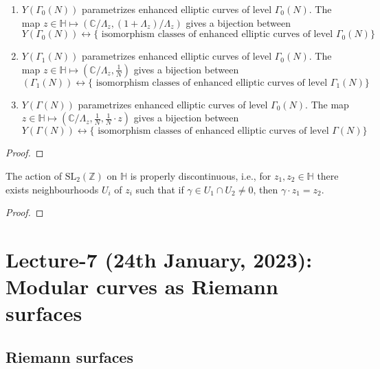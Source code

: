 \documentclass[oneside, 12pt]{scrbook}
\newcommand{\CC}{\mathbb C}
\newcommand{\ZZ}{\mathbb Z}
\newcommand{\SL}{\mathrm{SL}}
\newcommand{\HH}{\mathbb{H}}
\theoremstyle{theorem}
\begin{document}
\begin{proposition}
\begin{enumerate}
\item $Y(\Gamma_{0}(N))$ parametrizes enhanced elliptic curves of level $\Gamma_{0}(N)$. The map $z\in \HH \mapsto \left( \CC/\Lambda_{z} , \left( 1 + \Lambda_{z} \right)/\Lambda_{z}\right)$ gives a bijection between 
$$Y (\Gamma_{0}(N)) \leftrightarrow \{\text{ isomorphism classes of enhanced elliptic curves of level } \Gamma_{0}(N)\}$$
\item $Y(\Gamma_{1}(N))$ parametrizes enhanced elliptic curves of level $\Gamma_{0}(N)$. The map $z\in \HH \mapsto \left( \CC/\Lambda_{z} , \frac{1}{N} \right)$ gives a bijection between 
$$ (\Gamma_{1}(N)) \leftrightarrow \{\text{ isomorphism classes of enhanced elliptic curves of level } \Gamma_{1}(N)\}$$
\item $Y(\Gamma(N))$ parametrizes enhanced elliptic curves of level $\Gamma_{0}(N)$. The map $z\in \HH \mapsto \left( \CC/\Lambda_{z} , \frac{1}{N} , \frac{1}{N} \cdot z \right)$ gives a bijection between 
$$Y (\Gamma(N)) \leftrightarrow \{\text{ isomorphism classes of enhanced elliptic curves of level } \Gamma(N)\}$$
\end{enumerate}
\end{proposition}

\begin{proof}

\end{proof}

\begin{proposition}
The action of $\SL_{2}(\ZZ)$ on $\HH$ is properly discontinuous, i.e., for $z_{1},z_{2} \in \HH$ there exists neighbourhoods $U_{i}$ of $z_{i}$ such that if $\gamma \in U_{1}\cap U_{2} \neq 0$, then $\gamma \cdot z_{1} = z_{2}$.
\end{proposition}

\begin{proof}

\end{proof}

\chapter{Lecture-7 (24th January, 2023): Modular curves as Riemann surfaces}

\section{Riemann surfaces}
\end{document}
